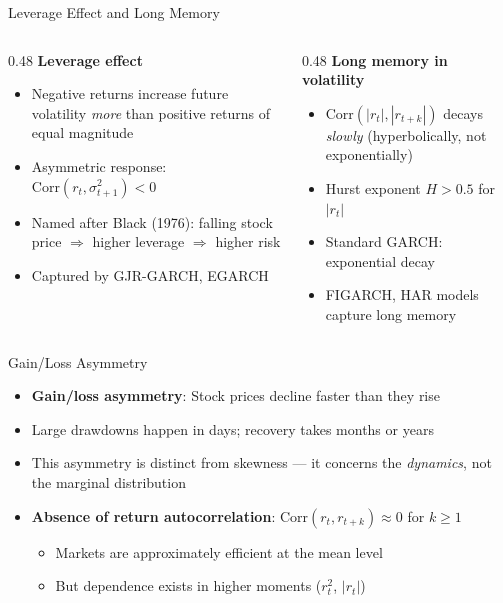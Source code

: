 \documentclass[9pt, aspectratio=169, t]{beamer}
\theoremstyle{definition}
\newcommand{\Corr}{\text{Corr}}
\begin{document}
\begin{frame}{Leverage Effect and Long Memory}
\begin{columns}[T]
\begin{column}{0.48\textwidth}
\textbf{Leverage effect}
\begin{itemize}
\item Negative returns increase future volatility \textit{more} than positive returns of equal magnitude
\item Asymmetric response: $\Corr(r_t, \sigma_{t+1}^2) < 0$
\item Named after Black (1976): falling stock price $\Rightarrow$ higher leverage $\Rightarrow$ higher risk
\item Captured by GJR-GARCH, EGARCH
\end{itemize}
\end{column}
\begin{column}{0.48\textwidth}
\textbf{Long memory in volatility}
\begin{itemize}
\item $\Corr(|r_t|, |r_{t+k}|)$ decays \textit{slowly} (hyperbolically, not exponentially)
\item Hurst exponent $H > 0.5$ for $|r_t|$
\item Standard GARCH: exponential decay
\item FIGARCH, HAR models capture long memory
\end{itemize}
\end{column}
\end{columns}
\end{frame}

\begin{frame}{Gain/Loss Asymmetry}
\begin{itemize}
\item \textbf{Gain/loss asymmetry}: Stock prices decline faster than they rise
\item Large drawdowns happen in days; recovery takes months or years
\item This asymmetry is distinct from skewness --- it concerns the \textit{dynamics}, not the marginal distribution
\item \textbf{Absence of return autocorrelation}: $\Corr(r_t, r_{t+k}) \approx 0$ for $k \geq 1$
\begin{itemize}
\item Markets are approximately efficient at the mean level
\item But dependence exists in higher moments ($r_t^2$, $|r_t|$)
\end{itemize}
\end{itemize}
\end{frame}
\end{document}
